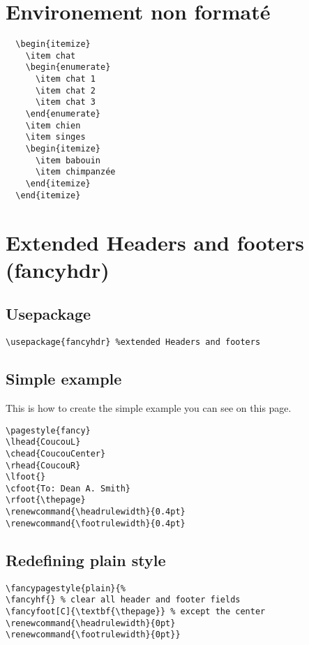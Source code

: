 \documentclass[a4paper,12pt]{article}
\begin{document}
\section{Environement non formaté}
\begin{verbatim}
  \begin{itemize}
    \item chat
    \begin{enumerate}
      \item chat 1
      \item chat 2
      \item chat 3
    \end{enumerate}
    \item chien
    \item singes
    \begin{itemize}
      \item babouin
      \item chimpanzée
    \end{itemize}
  \end{itemize}
\end{verbatim}

\newpage
\section{Extended Headers and footers (fancyhdr)}
\subsection{Usepackage}
\begin{verbatim}
\usepackage{fancyhdr} %extended Headers and footers
\end{verbatim}

\subsection{Simple example}
This is how to create the simple example you can see on this page.
\begin{verbatim}
\pagestyle{fancy}
\lhead{CoucouL}
\chead{CoucouCenter}
\rhead{CoucouR}
\lfoot{}
\cfoot{To: Dean A. Smith}
\rfoot{\thepage}
\renewcommand{\headrulewidth}{0.4pt}
\renewcommand{\footrulewidth}{0.4pt}
\end{verbatim}
\pagestyle{fancy}
\lfoot{}
\rfoot{\thepage}
\renewcommand{\headrulewidth}{0.4pt}
\renewcommand{\footrulewidth}{0.4pt}

\subsection{Redefining plain style}
\begin{verbatim}
\fancypagestyle{plain}{%
\fancyhf{} % clear all header and footer fields
\fancyfoot[C]{\textbf{\thepage}} % except the center
\renewcommand{\headrulewidth}{0pt}
\renewcommand{\footrulewidth}{0pt}}
\end{verbatim}
\newpage
\end{document}
